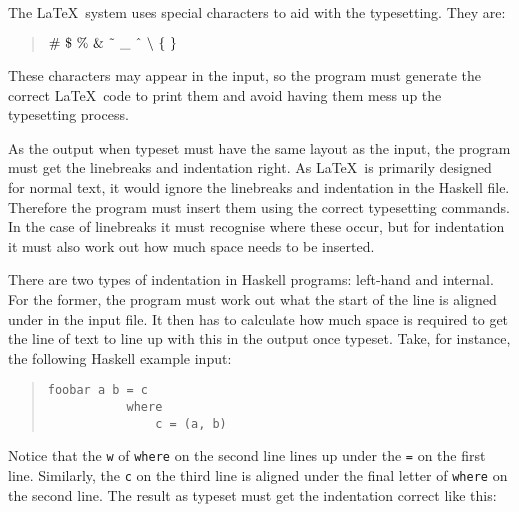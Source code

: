 The \LaTeX\ system uses special characters to aid with the typesetting.  
They are:
\begin{quote}
\(\#\ \$\ \%\ \&\ \char'176\ \_\ \char'136\ \hbox{$\setminus$}\ \hbox{$\cal \char'146\ \char'147$}\)
\end{quote}
These characters may
appear in the input, so the program must generate the correct \LaTeX\ code to
print them and
avoid having them mess up the typesetting process.

As the output when typeset must have the same layout as the input, the program
must get the linebreaks and indentation right.  As \LaTeX\ is primarily designed for normal
text, it would ignore the linebreaks and indentation in the Haskell file.  Therefore 
the program must insert them using the correct typesetting commands.  In the case of
linebreaks it must recognise where these occur, but for indentation it must also work out
how much space needs to be inserted.

There are two types of indentation in Haskell programs: left-hand and internal.
For the former, the program must work out what the start of the line is aligned
under in the input file.  It then has to calculate how much space is required
to get the line of text to line up with this in the output once typeset.  
Take, for instance, the following Haskell example input:
\begin{quote}
\begin{verbatim}
foobar a b = c
           where
               c = (a, b)
\end{verbatim}
\end{quote}
Notice that the {\tt w} of {\tt where} on the second line lines up
under the {\tt =} on
the first line.  Similarly, the {\tt c} on the third line is aligned under the
final letter of {\tt where} on the second line.  The result as typeset must
get the indentation correct like this:
\begin{quote}
\end{quote}

